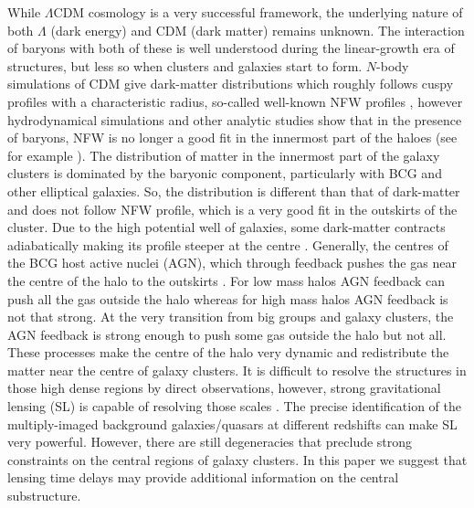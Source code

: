 \documentclass[
  11pt,
  twoside,
  openright,
  titlepage,
  headings=optiontoheadandtoc
]{scrbook}
\begin{document}
While $\Lambda$CDM cosmology is a very successful framework, the
underlying nature of both $\Lambda$ (dark energy) and CDM (dark
matter) remains unknown.  The interaction of baryons with both of
these is well understood during the linear-growth era of structures,
but less so when clusters and galaxies start to form.  $N$-body
simulations of CDM give dark-matter distributions which roughly
follows cuspy profiles with a characteristic radius, so-called
well-known NFW profiles \citep{1997ApJ...490..493N}, however
hydrodynamical simulations and other analytic studies show that in
the presence of baryons, NFW is no longer a good fit in the innermost
part of the haloes (see for example \cite{2014arXiv1409.8617S,2014arXiv1410.6826M}).
The distribution of matter in the innermost part of the galaxy
clusters is dominated by the baryonic component, particularly with BCG
and other elliptical galaxies. So, the distribution is different than
that of dark-matter and does not follow NFW profile, which is a very
good fit in the outskirts of the cluster. Due to the high potential
well of galaxies, some dark-matter contracts adiabatically making its
profile steeper at the centre \citep{1986ApJ...301...27B,2004ApJ...616...16G,
2005MNRAS.356..107R}. Generally, the centres of 
the BCG host active nuclei (AGN), which through feedback pushes 
the gas near the centre of the halo to the outskirts 
\citep{2005MNRAS.360..892D,2006Natur.442..539M, 
2013MNRAS.429.3068T, 2013MNRAS.432.1947M}.  For low mass halos 
AGN feedback can push all the gas outside the halo
whereas for high mass halos AGN feedback is not that strong. At the
very transition from big groups and galaxy clusters, the AGN feedback
is strong enough to push some gas outside the halo but not all. These
processes make the centre of the halo very dynamic and redistribute
the matter near the centre of galaxy clusters. It is difficult to
resolve the structures in those high dense regions by direct
observations,  however, strong gravitational lensing (SL) is capable
of resolving those scales \citep{1998MNRAS.294..734A,1991ApJ...383...66H,
2009MNRAS.397..341L,2008A&A...481...65H,2002sgdh.conf...50K,
2014MNRAS.439.2651M,2014ApJ...795...50S}.  The precise
  identification of the multiply-imaged background galaxies/quasars at
  different redshifts can make SL very powerful. However, there are
  still degeneracies that preclude strong constraints on the central
  regions of galaxy clusters.  In this paper we suggest that lensing
  time delays may provide additional information on the central
  substructure.
\end{document}
